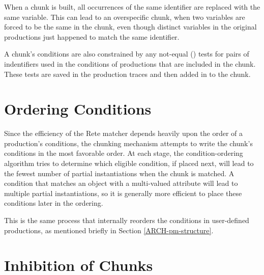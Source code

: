 When a chunk is built, all occurrences of the same identifier are replaced
with the same variable. This can lead to an overspecific chunk, when two
variables are forced to be the same in the chunk, even though distinct
variables in the original productions just happened to match the same
identifier.

A chunk's conditions are also constrained by any not-equal (\soar{<>}) tests
for pairs of indentifiers used in the conditions of productions that are
included in the chunk. These tests are saved in the production traces and then
added in to the chunk.

\section{Ordering Conditions}
\label{CHUNKING-ordering}


Since the efficiency of the Rete matcher  \cite{Forg81} depends
heavily upon the order of a production's conditions, the chunking mechanism
attempts to write the chunk's conditions in the most favorable order. At each
stage, the condition-ordering algorithm tries to determine which eligible
condition, if placed next, will lead to the fewest number of partial
instantiations when the chunk is matched. A condition that matches an object
with a multi-valued attribute will lead to multiple partial instantiations, so
it is generally more efficient to place these conditions later in the
ordering.

This is the same process that internally reorders the conditions in
user-defined productions, as mentioned briefly in Section \ref{ARCH-pm-structure}. 


\section{Inhibition of Chunks}
\label{CHUNKING-inhibition}

